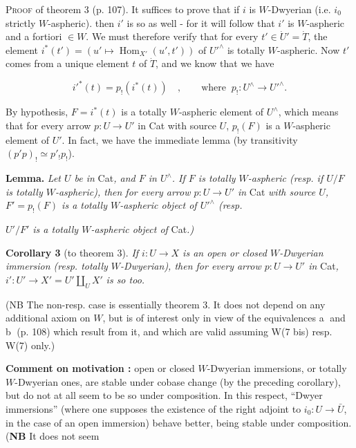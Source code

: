 \documentclass[11pt]{article}
\newcommand{\msp}[1]{\marginpar{\footnotesize [#1]}}
\begin{document}
\textsc{Proof} of theorem 3 (p. 107). It suffices to prove that if $i$ is $W$-Dwyerian (i.e. $i_0$ strictly $W$-aspheric). then $i'$ is so as well - for it will follow that $i'$ is $W$-aspheric and a fortiori $\in W$. We must therefore verify that for every $t'\in\dot{U}'=\dot{T}$, the element $i^*(t')=(u'\longmapsto\operatorname{Hom}_{X'}(u',t'))$ of $U'^\wedge$ is totally $W$-aspheric. Now $t'$ comes from a unique element $t$ of $\dot{T}$, and we know that we have %

\[ i'^*(t)=p_!(i^*(t))\quad,\qquad\text{where }\ p_!:U^\wedge\longrightarrow U'^\wedge. \]

By hypothesis, $F=i^*(t)$ is a totally $W$-aspheric element of $U^\wedge$, which means that for every arrow $p:U\longrightarrow U'$ in Cat with source $U$, $p_!(F)$ is a $W$-aspheric element of $U'$. In fact, we have the immediate lemma (by transitivity $(p'p)_!\simeq p'_!p_!$). %

\textbf{Lemma.} \textit{Let $U$ be in} Cat\textit{, and $F$ in $U^\wedge$. If $F$ is totally $W$-aspheric (resp. if $U/F$ is totally $W$-aspheric), then for every arrow $p:U\longrightarrow U'$ in} Cat \textit{with source $U$, $F'=p_!(F)$ is a totally $W$-aspheric object of $U'^\wedge$ (resp.}

\msp{page 113}

\textit{$U'/F'$ is a totally $W$-aspheric object of} Cat\textit{.)}

\textbf{Corollary 3} (to theorem 3). \textit{If $i:U\longrightarrow X$ is an open or closed $W$-Dwyerian immersion (resp. totally $W$-Dwyerian), then for every arrow $p:U\longrightarrow U'$ in} Cat\textit{, $i':U'\longrightarrow X'=U'\amalg_U X'$} \textit{is so too.}

(NB The non-resp. case is essentially theorem 3. It does not depend on any additional axiom on $W$, but is of interest only in view of the equivalences \textcircled{a} and \textcircled{b} (p. 108) which result from it, and which are valid assuming W(7 bis) resp. W(7) only.)

\textbf{Comment on motivation :} open or closed $W$-Dwyerian immersions, or totally $W$-Dwyerian ones, are stable under cobase change (by the preceding corollary), but do not at all seem to be so under composition. In this respect, ``Dwyer immersions'' (where one supposes the existence of the right adjoint to $i_0:U\longrightarrow\bar{U}$, in the case of an open immersion) behave better, being stable under composition. (\textbf{NB} It does not seem
\end{document}
